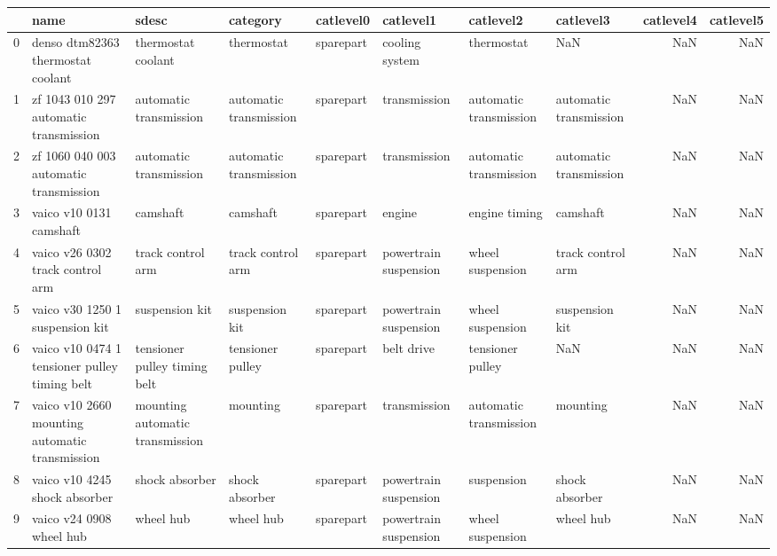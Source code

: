 \begin{tabular}{llllllllrr}
      \toprule
       & name & sdesc & category & catlevel0 & catlevel1 & catlevel2 & catlevel3 & catlevel4 & catlevel5 \\
      \midrule
      0 & denso dtm82363 thermostat coolant & thermostat coolant & thermostat & sparepart & cooling system & thermostat & NaN & NaN & NaN \\
      1 & zf 1043 010 297 automatic transmission & automatic transmission & automatic transmission & sparepart & transmission & automatic transmission & automatic transmission & NaN & NaN \\
      2 & zf 1060 040 003 automatic transmission & automatic transmission & automatic transmission & sparepart & transmission & automatic transmission & automatic transmission & NaN & NaN \\
      3 & vaico v10 0131 camshaft & camshaft & camshaft & sparepart & engine & engine timing & camshaft & NaN & NaN \\
      4 & vaico v26 0302 track control arm & track control arm & track control arm & sparepart & powertrain suspension & wheel suspension & track control arm & NaN & NaN \\
      5 & vaico v30 1250 1 suspension kit & suspension kit & suspension kit & sparepart & powertrain suspension & wheel suspension & suspension kit & NaN & NaN \\
      6 & vaico v10 0474 1 tensioner pulley timing belt & tensioner pulley timing belt & tensioner pulley & sparepart & belt drive & tensioner pulley & NaN & NaN & NaN \\
      7 & vaico v10 2660 mounting automatic transmission & mounting automatic transmission & mounting & sparepart & transmission & automatic transmission & mounting & NaN & NaN \\
      8 & vaico v10 4245 shock absorber & shock absorber & shock absorber & sparepart & powertrain suspension & suspension & shock absorber & NaN & NaN \\
      9 & vaico v24 0908 wheel hub & wheel hub & wheel hub & sparepart & powertrain suspension & wheel suspension & wheel hub & NaN & NaN \\
      \bottomrule
      \end{tabular}